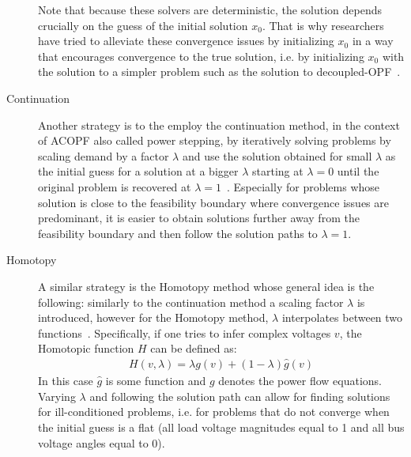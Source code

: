 \documentclass[11pt]{cmuthesis} %
\begin{document}
\begin{description}
Note that because these solvers are deterministic, the solution depends crucially on the guess of the initial solution $x_0$. That is why researchers have tried to alleviate these convergence issues by initializing $x_0$ in a way that encourages convergence to the true solution, i.e. by initializing $x_0$ with the solution to a simpler problem such as the solution to decoupled-OPF~\cite{leonidopoulos1995approximate,klump2000techniques,stott1971effective}.\\
\item[Continuation] Another strategy is to the employ the continuation method, in the context of ACOPF also called power stepping, by iteratively solving problems by scaling demand by a factor $\lambda$ and use the solution obtained for small $\lambda$ as the initial guess for a solution at a bigger $\lambda$ starting at $\lambda = 0$ until the original problem is recovered at $\lambda = 1$~\cite{milano2009continuous}. Especially for problems whose solution is close to the feasibility boundary where convergence issues are predominant, it is easier to obtain solutions further away from the feasibility boundary and then follow the solution paths to $\lambda = 1$. 
\item[Homotopy] A similar strategy is the Homotopy method whose general idea is the following: similarly to the continuation method a scaling factor $\lambda$ is introduced, however for the Homotopy method, $\lambda$ interpolates between two functions~\cite{okumura1991solution,ponrajah1989minimum}. Specifically, if one tries to infer complex voltages $v$, the Homotopic function $H$ can be defined as:
\begin{align*}
H(v,\lambda) = \lambda g(v) + (1-\lambda) \hat{g}(v)
\end{align*}
In this case $\hat{g}$ is some function and $g$ denotes the power flow equations. Varying $\lambda$ and following the solution path can allow for finding solutions for ill-conditioned problems, i.e. for problems that do not converge when the initial guess is a flat (all load voltage
magnitudes equal to 1 and all bus voltage angles equal to
0).\\


\end{description}
\end{document}
